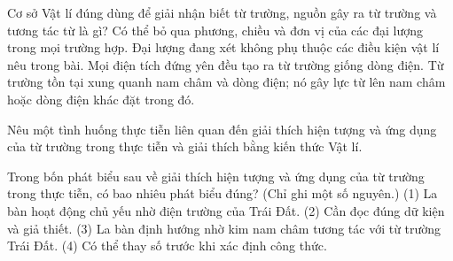\begin{ex}
Cơ sở Vật lí đúng dùng để giải nhận biết từ trường, nguồn gây ra từ trường và tương tác từ là gì?
\choice
{Có thể bỏ qua phương, chiều và đơn vị của các đại lượng trong mọi trường hợp.}
{Đại lượng đang xét không phụ thuộc các điều kiện vật lí nêu trong bài.}
{Mọi điện tích đứng yên đều tạo ra từ trường giống dòng điện.}
{\True Từ trường tồn tại xung quanh nam châm và dòng điện; nó gây lực từ lên nam châm hoặc dòng điện khác đặt trong đó.}
\end{ex}

\begin{bt}
Nêu một tình huống thực tiễn liên quan đến giải thích hiện tượng và ứng dụng của từ trường trong thực tiễn và giải thích bằng kiến thức Vật lí.
\end{bt}

\begin{ex}
Trong bốn phát biểu sau về giải thích hiện tượng và ứng dụng của từ trường trong thực tiễn, có bao nhiêu phát biểu đúng? (Chỉ ghi một số nguyên.) (1) La bàn hoạt động chủ yếu nhờ điện trường của Trái Đất. (2) Cần đọc đúng dữ kiện và giả thiết. (3) La bàn định hướng nhờ kim nam châm tương tác với từ trường Trái Đất. (4) Có thể thay số trước khi xác định công thức.
\end{ex}

